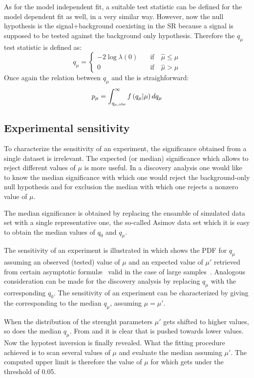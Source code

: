 As for the model independent fit, a suitable test statistic can be defined for the model dependent fit as well, in a very similar way. However, now the null hypothesis is the signal+background coexisting in the SR because a signal is supposed to be tested against the background only hypothesis. Therefore the $q_\mu$ test statistic is defined as:
\begin{equation}
q_\mu=
\left\{
\begin{aligned}
-2\log{\lambda(0)}\quad &\text{if}\quad \hat{\mu}\le\mu\\
 0 \qquad&\text{if}\quad \hat{\mu}>\mu
\end{aligned}
\right.
\end{equation} 
Once again the relation between $q_\mu$ and the \p is straighforward:
\begin{equation}
 p_{\mu}=\int_{q_{\mu,\textup{obs}}}^\infty f\left(q_\mu \vert \mu\right) dq_\mu
 \label{eqn:pdaqmu}
\end{equation}

\subsection{Experimental sensitivity}
\label{sec:sensitivity}
To characterize the sensitivity of an experiment, the significance obtained from a single dataset is irrelevant. The expected (or median) significance which allows to reject different values of $\mu$ is more useful. In a discovery analysis one would like to know the median significance with which one would reject the background-only null hypothesis and for exclusion the median with which one rejects a nonzero value of $\mu$.

The median significance is obtained by replacing the ensamble of simulated data set with a single representative one, the so-called Asimov data set which it is easy to obtain the median values of $q_0$ and $q_\mu$.

The sensitivity of an experiment is illustrated in \Fig{\ref{fig:medianq}} which shows the PDF for $q_\mu$ assuming an observed (tested) value of $\mu$ and an expected value of $\mu'$ retrieved from certain asymptotic formul\ae~ valid in the case of large samples~\cite{Cowan}. Analogous consideration can be made for the discovery analysis by replacing $q_\mu$ with the corresponding $q_0$. The sensitivity of an experiment can be characterized by giving the \p corresponding to the median $q_\mu$, assuming $\mu=\mu'$. 

When the distribution of the strenght parameters $\mu'$ gets shifted to higher values, so does the median $q_\mu$. From \Eqn{\ref{eqn:pdaq0}} and \Eqn{\ref{eqn:pdaqmu}} it is clear that \p is pushed towards lower values. Now the hypotest inversion is finally revealed. What the fitting procedure achieved is to scan several values of $\mu$ and evaluate the median \p assuming $\mu'$. The computed upper limit is therefore the value of $\mu$ for which \p gets under the threshold of \num{0.05}.

